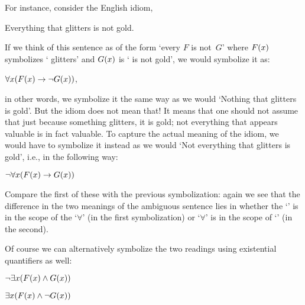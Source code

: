 For instance, consider the English idiom,
\begin{earg}
	\item[\ex{glitters}]
	Everything that glitters is not gold.
\end{earg}
If we think of this sentence as of the form `every $F$ is not~$G$' where $\mathord{F}(x)$ symbolizes ` glitters' and $\mathord{G}(x)$ is ` is not gold', we would symbolize it as:
\begin{earg}
	\item[] $\forall x(\mathord{F}(x) \rightarrow \neg \mathord{G}(x))$,
\end{earg}
in other words, we symbolize it the same way as we would `Nothing that glitters is gold'. But the idiom does not mean that! It means that one should not assume that just because something glitters, it is gold; not everything that appears valuable is in fact valuable.  To capture the actual meaning of the idiom, we would have to symbolize it instead as we would `Not everything that glitters is gold', i.e., in the following way:
\begin{earg}
	\item[] $\neg\forall x(\mathord{F}(x) \rightarrow \mathord{G}(x))$
\end{earg}
Compare the first of these with the previous symbolization: again we see that the difference in the two meanings of the ambiguous sentence lies in whether the `\enot' is in the scope of the `$\forall$' (in the first symbolization) or `$\forall$' is in the scope of `\enot' (in the second).

Of course we can alternatively symbolize the two readings using existential quantifiers as well:
\begin{earg}
	\item[] $\neg\exists x(\mathord{F}(x) \wedge \mathord{G}(x))$
	\item[] $\exists x(\mathord{F}(x) \wedge \neg \mathord{G}(x))$
\end{earg}

